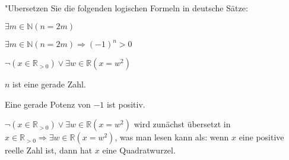 "Ubersetzen Sie die folgenden logischen Formeln in deutsche Sätze:
\begin{teilaufgaben}
\item $\exists m\in\mathbb N (n=2m)$
\item $\exists m\in\mathbb N (n=2m)\Rightarrow (-1)^n > 0$
\item $\neg(x\in\mathbb R_{>0})\vee \exists w\in\mathbb R(x=w^2)$
\end{teilaufgaben}

\begin{loesung}
\begin{teilaufgaben}
\item $n$ ist eine gerade Zahl.
\item Eine gerade Potenz von $-1$ ist positiv.
\item $\neg (x\in\mathbb R_{>0})\vee \exists w\in\mathbb R(x=w^2)$ wird zunächst
übersetzt in
$x\in\mathbb R_{>0}\Rightarrow \exists w\in\mathbb R(x=w^2)$, was man lesen
kann als: wenn $x$ eine positive reelle Zahl ist, dann hat $x$ eine
Quadratwurzel.
\qedhere
\end{teilaufgaben}
\end{loesung}

